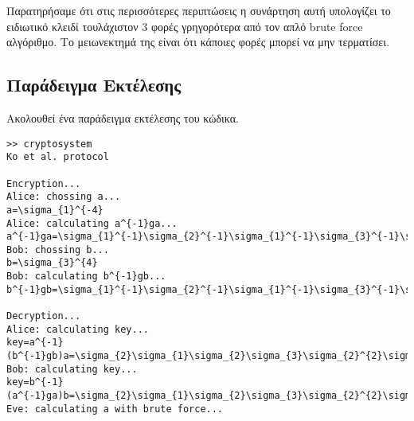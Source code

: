 \documentclass[a4paper,11pt]{article}
\begin{document}
Παρατηρήσαμε ότι στις περισσότερες περιπτώσεις η συνάρτηση αυτή υπολογίζει το ειδιωτικό κλειδί τουλάχιστον 3 φορές γρηγορότερα από τον απλό brute force αλγόριθμο. Το μειωνεκτημά της είναι ότι κάποιες φορές μπορεί να μην τερματίσει.

\subsection{Παράδειγμα Εκτέλεσης}
Ακολουθεί ένα παράδειγμα εκτέλεσης του κώδικα.

\begin{lstlisting}
>> cryptosystem
Ko et al. protocol
 
Encryption...
Alice: chossing a...
a=\sigma_{1}^{-4}
Alice: calculating a^{-1}ga...
a^{-1}ga=\sigma_{1}^{-1}\sigma_{2}^{-1}\sigma_{1}^{-1}\sigma_{3}^{-1}\sigma_{2}^{-1}\sigma_{1}^{-2}\sigma_{2}^{-1}\sigma_{1}^{-1}\sigma_{3}^{-1}\sigma_{2}^{-1}\sigma_{1}^{-2}\sigma_{2}^{-1}\sigma_{1}^{-1}\sigma_{3}^{-1}\sigma_{2}^{-1}\sigma_{1}^{-2}\sigma_{2}^{-1}\sigma_{1}^{-1}\sigma_{3}^{-1}\sigma_{2}^{-1}\sigma_{1}^{-1}\sigma_{3}\sigma_{1}\sigma_{3}\sigma_{2}\sigma_{1}\sigma_{2}\sigma_{1}\sigma_{2}\sigma_{3}\sigma_{1}^{2}\sigma_{2}\sigma_{3}\sigma_{2}\sigma_{1}^{2}\sigma_{2}\sigma_{3}\sigma_{2}\sigma_{1}^{2}\sigma_{2}^{2}\sigma_{1}^{2}\sigma_{2}\sigma_{3}
Bob: chossing b...
b=\sigma_{3}^{4}
Bob: calculating b^{-1}gb...
b^{-1}gb=\sigma_{1}^{-1}\sigma_{2}^{-1}\sigma_{1}^{-1}\sigma_{3}^{-1}\sigma_{2}^{-1}\sigma_{1}^{-2}\sigma_{2}^{-1}\sigma_{1}^{-1}\sigma_{3}^{-1}\sigma_{2}^{-1}\sigma_{1}^{-2}\sigma_{2}^{-1}\sigma_{1}^{-1}\sigma_{3}^{-1}\sigma_{2}^{-1}\sigma_{1}^{-2}\sigma_{2}^{-1}\sigma_{1}^{-1}\sigma_{3}^{-1}\sigma_{2}^{-1}\sigma_{1}^{-2}\sigma_{2}^{-1}\sigma_{1}^{-1}\sigma_{3}^{-1}\sigma_{2}^{-1}\sigma_{1}^{-1}\sigma_{2}\sigma_{1}\sigma_{3}\sigma_{2}\sigma_{1}\sigma_{2}\sigma_{1}\sigma_{2}\sigma_{3}\sigma_{2}^{2}\sigma_{1}\sigma_{3}\sigma_{2}\sigma_{1}\sigma_{2}\sigma_{3}^{5}
 
Decryption...
Alice: calculating key...
key=a^{-1}(b^{-1}gb)a=\sigma_{2}\sigma_{1}\sigma_{2}\sigma_{3}\sigma_{2}^{2}\sigma_{1}\sigma_{3}\sigma_{2}\sigma_{1}^{2}\sigma_{2}\sigma_{1}^{2}\sigma_{2}\sigma_{3}\sigma_{1}\sigma_{3}\sigma_{2}\sigma_{1}\sigma_{2}^{2}\sigma_{1}\sigma_{2}\sigma_{3}\sigma_{2}^{2}\sigma_{1}^{2}\sigma_{2}^{2}\sigma_{1}^{2}\sigma_{2}\sigma_{3}^{5}
Bob: calculating key...
key=b^{-1}(a^{-1}ga)b=\sigma_{2}\sigma_{1}\sigma_{2}\sigma_{3}\sigma_{2}^{2}\sigma_{1}\sigma_{3}\sigma_{2}\sigma_{1}^{2}\sigma_{2}\sigma_{1}^{2}\sigma_{2}\sigma_{3}\sigma_{1}\sigma_{3}\sigma_{2}\sigma_{1}\sigma_{2}^{2}\sigma_{1}\sigma_{2}\sigma_{3}\sigma_{2}^{2}\sigma_{1}^{2}\sigma_{2}^{2}\sigma_{1}^{2}\sigma_{2}\sigma_{3}^{5}
Eve: calculating a with brute force...


\end{lstlisting}
\end{document}
